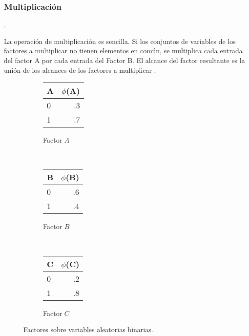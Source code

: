 \subsubsection{Multiplicación}

\begin{definition}[Multiplicación]

\parencite[107]{KollerFriedman2009}.
\end{definition}

La operación de multiplicación es sencilla. Si los conjuntos de variables de los factores a multiplicar no tienen elementos en común, se multiplica cada entrada del factor A por cada entrada del Factor B. El alcance del factor resultante es la unión de los alcances de los factores a multiplicar \parencite[107]{KollerFriedman2009}.


\begin{figure}
    \centering
    \begin{subfigure}[b]{0.3\textwidth}
        \centering
        \begin{tabular}{ l | r }
          A & $\phi$(A)\\ \hline
          0 & .3  \\ \hline
          1 & .7  \\
        \end{tabular}
        \caption{Factor $A$}
    \end{subfigure}
    ~ 
    \begin{subfigure}[b]{0.3\textwidth}
        \centering
        \begin{tabular}{ l | r }
          B & $\phi$(B)\\ \hline
          0 & .6  \\ \hline
          1 & .4  \\
        \end{tabular}
        \caption{Factor $B$}
    \end{subfigure}
    ~
    \begin{subfigure}[b]{0.3\textwidth}
        \centering
        \begin{tabular}{ l | r }
          C & $\phi$(C)\\ \hline
          0 & .2  \\ \hline
          1 & .8  \\
        \end{tabular}
        \caption{Factor $C$}
    \end{subfigure}
    \caption{Factores sobre variables aleatorias binarias.}\label{fig:ABC}
\end{figure}

